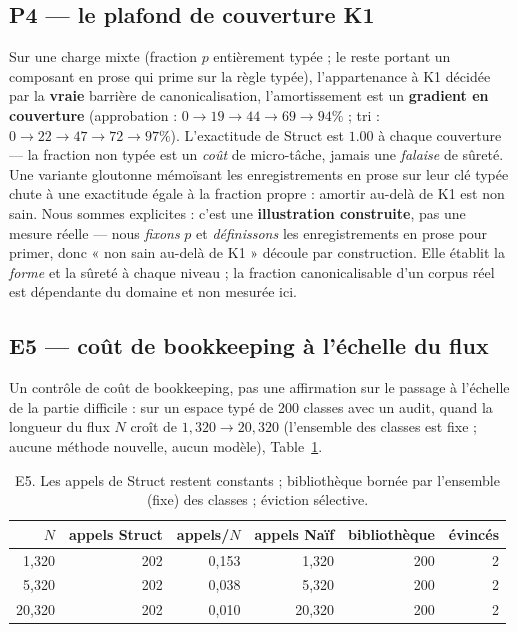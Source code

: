 \documentclass[11pt]{article}
\newcommand{\K}{\textsf{K1}}
\begin{document}
\subsection{P4 --- le plafond de couverture \K{}}
Sur une charge mixte (fraction $p$ entièrement typée ; le reste portant un composant en prose qui prime sur la règle
typée), l'appartenance à \K{} décidée par la \textbf{vraie} barrière de canonicalisation, l'amortissement est un
\textbf{gradient en couverture} (approbation : $0\to19\to44\to69\to94\%$ ; tri : $0\to22\to47\to72\to97\%$).
L'exactitude de Struct est $1.00$ à chaque couverture --- la fraction non typée est un \emph{coût} de micro-tâche,
jamais une \emph{falaise} de sûreté. Une variante gloutonne mémoïsant les enregistrements en prose sur leur clé
typée chute à une exactitude égale à la fraction propre : amortir au-delà de \K{} est non sain. Nous sommes
explicites : c'est une \textbf{illustration construite}, pas une mesure réelle --- nous \emph{fixons} $p$ et
\emph{définissons} les enregistrements en prose pour primer, donc « non sain au-delà de \K{} » découle par
construction. Elle établit la \emph{forme} et la sûreté à chaque niveau ; la fraction canonicalisable d'un corpus
réel est dépendante du domaine et non mesurée ici.

\subsection{E5 --- coût de bookkeeping à l'échelle du flux}
Un contrôle de coût de bookkeeping, pas une affirmation sur le passage à l'échelle de la partie difficile : sur un
espace typé de 200 classes avec un audit, quand la longueur du flux $N$ croît de $1{,}320\to20{,}320$
(l'ensemble des classes est fixe ; aucune méthode nouvelle, aucun modèle), Table~\ref{tab:e5}.

\begin{table}[h]\centering
\begin{tabular}{rrrrrr}
\toprule
$N$ & appels Struct & appels/$N$ & appels Naïf & bibliothèque & évincés \\
\midrule
1{,}320 & 202 & 0,153 & 1{,}320 & 200 & 2 \\
5{,}320 & 202 & 0,038 & 5{,}320 & 200 & 2 \\
20{,}320 & 202 & 0,010 & 20{,}320 & 200 & 2 \\
\bottomrule
\end{tabular}
\caption{E5. Les appels de Struct restent constants ; bibliothèque bornée par l'ensemble (fixe) des classes ; éviction sélective.}
\label{tab:e5}
\end{table}
\end{document}

